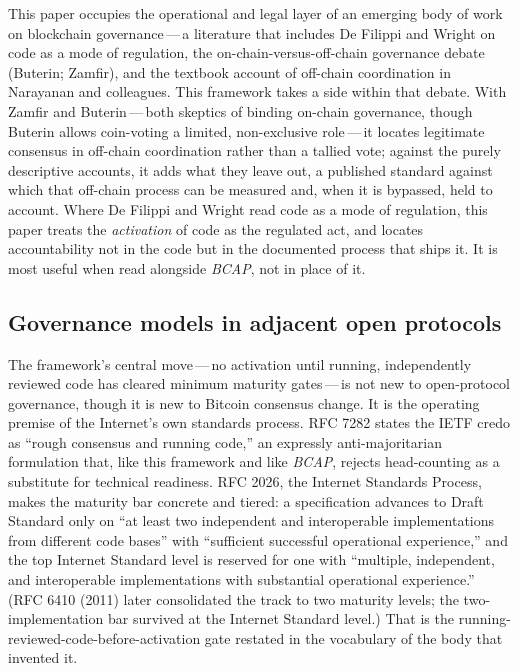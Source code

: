 \documentclass[11pt, twoside, openright]{book}
\begin{document}
This paper occupies the operational and legal layer of an emerging body of work on blockchain governance\,---\,a literature that includes De Filippi and Wright on code as a mode of regulation, the on-chain-versus-off-chain governance debate (Buterin; Zamfir), and the textbook account of off-chain coordination in Narayanan and colleagues. This framework takes a side within that debate. With Zamfir and Buterin\,---\,both skeptics of binding on-chain governance, though Buterin allows coin-voting a limited, non-exclusive role\,---\,it locates legitimate consensus in off-chain coordination rather than a tallied vote; against the purely descriptive accounts, it adds what they leave out, a published standard against which that off-chain process can be measured and, when it is bypassed, held to account. Where De Filippi and Wright read code as a mode of regulation, this paper treats the \textit{activation} of code as the regulated act, and locates accountability not in the code but in the documented process that ships it. It is most useful when read alongside \textit{BCAP}, not in place of it.

\subsection*{Governance models in adjacent open protocols}

The framework's central move\,---\,no activation until running, independently reviewed code has cleared minimum maturity gates\,---\,is not new to open-protocol governance, though it is new to Bitcoin consensus change. It is the operating premise of the Internet's own standards process. RFC 7282 states the IETF credo as ``rough consensus and running code,'' an expressly anti-majoritarian formulation that, like this framework and like \textit{BCAP}, rejects head-counting as a substitute for technical readiness. RFC 2026, the Internet Standards Process, makes the maturity bar concrete and tiered: a specification advances to Draft Standard only on ``at least two independent and interoperable implementations from different code bases'' with ``sufficient successful operational experience,'' and the top Internet Standard level is reserved for one with ``multiple, independent, and interoperable implementations with substantial operational experience.'' (RFC 6410 (2011) later consolidated the track to two maturity levels; the two-implementation bar survived at the Internet Standard level.) That is the running-reviewed-code-before-activation gate restated in the vocabulary of the body that invented it.
\end{document}
